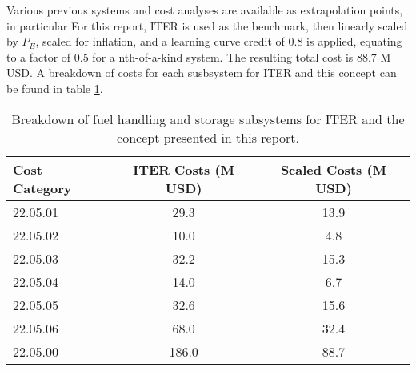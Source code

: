 Various previous systems and cost analyses are available as extrapolation points, in particular For this report, ITER is used as the benchmark, then linearly scaled by $P_E$, scaled for inflation, and a learning curve credit of 0.8 is applied, equating to a factor of 0.5 for a nth-of-a-kind system.  The resulting total cost is 88.7 M USD. A breakdown of costs for each susbsystem for ITER and this concept can be found in table \ref{tab:fuel}.



\begin{table}
    \centering
    \begin{tabular}{lcc}
    \hline
        Cost Category & ITER Costs (M USD) & Scaled Costs (M USD)\\
        \hline
       22.05.01  & 29.3 & 13.9\\
       22.05.02  & 10.0 & 4.8\\
       22.05.03  & 32.2 & 15.3\\
       22.05.04  & 14.0 & 6.7\\
       22.05.05  & 32.6 & 15.6\\
       22.05.06  & 68.0 & 32.4\\
       22.05.00  & 186.0   & 88.7\\
       \hline
    \end{tabular}
    \caption{Breakdown of fuel handling and storage subsystems for ITER and the concept presented in this report.}
    \label{tab:fuel}
\end{table}
